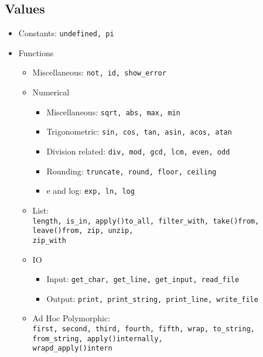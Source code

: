 \documentclass{article}
\begin{document}
\subsection{Values}

\begin{itemize}

\item Constants: \texttt{undefined, pi}

\item Functions
  \begin{itemize}

  \item Miscellaneous: \texttt{not, id, show_error}

  \item Numerical
    \begin{itemize}
    \item Miscellaneous: \texttt{sqrt, abs, max, min}
    \item Trigonometric: \texttt{sin, cos, tan, asin, acos, atan}
    \item Division related: \texttt{div, mod, gcd, lcm, even, odd}
    \item Rounding: \texttt{truncate, round, floor, ceiling}
    \item e and log: \texttt{exp, ln, log}
    \end{itemize}

  \item List:\\
    \texttt{length, is_in, apply()to_all, filter_with, take()from, leave()from,
    zip, unzip,\\ zip_with}

  \item IO
    \begin{itemize}
    \item Input: \texttt{get_char, get_line, get_input, read_file}
    \item Output: \texttt{print, print_string, print_line, write_file}
    \end{itemize}

  \item Ad Hoc Polymorphic:\\
  \texttt{first, second, third, fourth, fifth, wrap, to_string, from_string,
  apply()internally, \\wrapd_apply()intern}

  \end{itemize}
\end{itemize}
\end{document}
